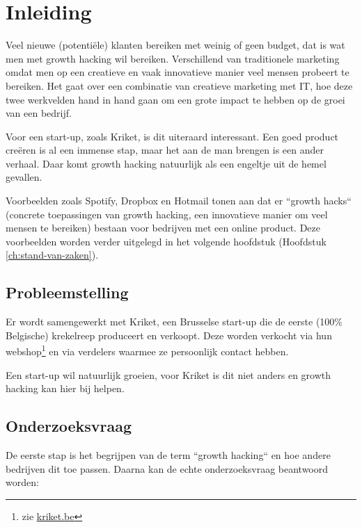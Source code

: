 
\chapter{Inleiding}
\label{ch:inleiding}

Veel nieuwe (potentiële) klanten bereiken met weinig of geen budget, dat is wat men met growth hacking wil bereiken. Verschillend van traditionele marketing omdat men op een creatieve en vaak innovatieve manier veel mensen probeert te bereiken. Het gaat over een combinatie van creatieve marketing met IT, hoe deze twee werkvelden hand in hand gaan om een grote impact te hebben op de groei van een bedrijf.

Voor een start-up, zoals Kriket, is dit uiteraard interessant. Een goed product creëren is al een immense stap, maar het aan de man brengen is een ander verhaal. Daar komt growth hacking natuurlijk als een engeltje uit de hemel gevallen. 

Voorbeelden zoals Spotify, Dropbox en Hotmail tonen aan dat er ``growth hacks`` (concrete toepassingen van growth hacking, een innovatieve manier om veel mensen te bereiken) bestaan voor bedrijven met een online product. Deze voorbeelden worden verder uitgelegd in het volgende hoofdstuk (Hoofdstuk \ref{ch:stand-van-zaken}).

\section{Probleemstelling}
\label{sec:probleemstelling}

Er wordt samengewerkt met Kriket, een Brusselse start-up die de eerste (100\% Belgische) krekelreep produceert en verkoopt. Deze worden verkocht via hun webshop\footnote{zie \href{https://kriket.be}{kriket.be}} en via verdelers waarmee ze persoonlijk contact hebben.

Een start-up wil natuurlijk groeien, voor Kriket is dit niet anders en growth hacking kan hier bij helpen.

\section{Onderzoeksvraag}
\label{sec:onderzoeksvraag}

De eerste stap is het begrijpen van de term ``growth hacking`` en hoe andere bedrijven dit toe passen. Daarna kan de echte onderzoeksvraag beantwoord worden:

